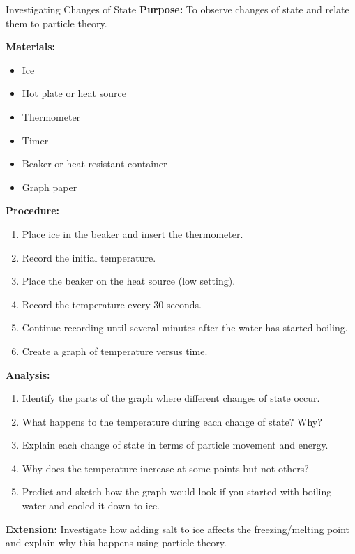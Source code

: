 \begin{investigation}{Investigating Changes of State}
\textbf{Purpose:} To observe changes of state and relate them to particle theory.

\textbf{Materials:}
\begin{itemize}
    \item Ice
    \item Hot plate or heat source
    \item Thermometer
    \item Timer
    \item Beaker or heat-resistant container
    \item Graph paper
\end{itemize}

\textbf{Procedure:}
\begin{enumerate}
    \item Place ice in the beaker and insert the thermometer.
    \item Record the initial temperature.
    \item Place the beaker on the heat source (low setting).
    \item Record the temperature every 30 seconds.
    \item Continue recording until several minutes after the water has started boiling.
    \item Create a graph of temperature versus time.
\end{enumerate}

\textbf{Analysis:}
\begin{enumerate}
    \item Identify the parts of the graph where different changes of state occur.
    \item What happens to the temperature during each change of state? Why?
    \item Explain each change of state in terms of particle movement and energy.
    \item Why does the temperature increase at some points but not others?
    \item Predict and sketch how the graph would look if you started with boiling water and cooled it down to ice.
\end{enumerate}

\textbf{Extension:} Investigate how adding salt to ice affects the freezing/melting point and explain why this happens using particle theory.
\end{investigation}

